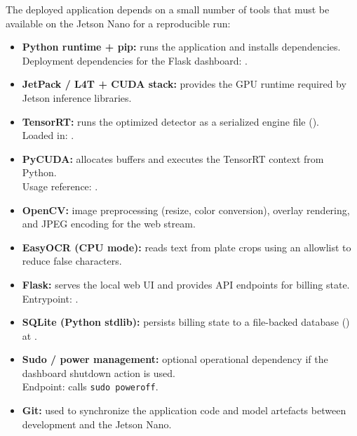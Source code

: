 \noindent
The deployed application depends on a small number of tools that must be available on the Jetson Nano for a reproducible run:
\begin{itemize}
	\item \textbf{Python runtime + pip:} runs the application and installs dependencies.\\
	\noindent Deployment dependencies for the Flask dashboard: .
	
	\item \textbf{JetPack / L4T + CUDA stack:} provides the GPU runtime required by Jetson inference libraries.
	
	\item \textbf{TensorRT:} runs the optimized detector as a serialized engine file ().\\
	\noindent Loaded in: .
	
	\item \textbf{PyCUDA:} allocates buffers and executes the TensorRT context from Python.\\
	\noindent Usage reference: .
	
	\item \textbf{OpenCV:} image preprocessing (resize, color conversion), overlay rendering, and JPEG encoding for the web stream.
	
	\item \textbf{EasyOCR (CPU mode):} reads text from plate crops using an allowlist to reduce false characters.
	
	\item \textbf{Flask:} serves the local web UI and provides API endpoints for billing state.\\
	\noindent Entrypoint: .
	
	\item \textbf{SQLite (Python stdlib):} persists billing state to a file-backed database () at .
	
	\item \textbf{Sudo / power management:} optional operational dependency if the dashboard shutdown action is used.\\
	\noindent Endpoint:  calls \texttt{sudo poweroff}.
	
	\item \textbf{Git:} used to synchronize the application code and model artefacts between development and the Jetson Nano.
\end{itemize}


